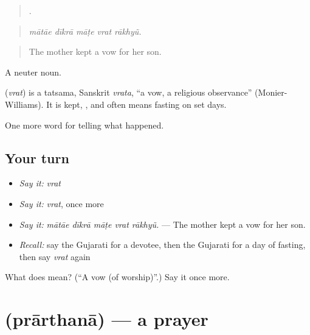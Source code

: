 \begin{quote}
    .
\end{quote}

\begin{quote}
\emph{mātāe dīkrā māṭe vrat rākhyũ.}
\end{quote}

\begin{quote}
The mother kept a vow for her son.
\end{quote}

A neuter noun.

\begin{cousinweb}
\textbf{} (\emph{vrat}) is a tatsama, Sanskrit \emph{vrata}, \textquotedblleft{}a vow, a religious observance\textquotedblright{} (Monier-Williams). It is kept, \textbf{ }, and often means fasting on set days.
\end{cousinweb}

\begin{grammarlens}[title={What you've built}]
One more word for telling what happened.
\end{grammarlens}

\subsection*{Your turn}
\begin{itemize}
\raggedright
  \item \emph{Say it:} \emph{vrat}
  \item \emph{Say it:} \emph{vrat}, once more
  \item \emph{Say it:} \emph{mātāe dīkrā māṭe vrat rākhyũ.} — The mother kept a vow for her son.
  \item \emph{Recall:} say the Gujarati for a devotee, then the Gujarati for a day of fasting, then say \emph{vrat} again
\end{itemize}

\begin{tcolorbox}[breakable,colback=teal!4,colframe=teal!35!black,title={Before you move on}]
What does  mean? (\textquotedblleft{}A vow (of worship)\textquotedblright{}.) Say it once more.
\end{tcolorbox}
\section[\texorpdfstring{\gu{પ્રાર્થના} (prārthanā)}{પ્રાર્થના (prārthanā)}]{ (prārthanā) — a prayer}

